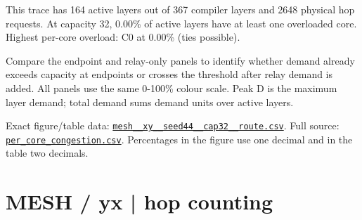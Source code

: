 \documentclass[10pt,a4paper]{article}
\begin{document}
This trace has 164 active layers out of 367 compiler layers and 2648 physical hop requests. At capacity 32, 0.00\% of active layers have at least one overloaded core. Highest per-core overload: C0 at 0.00\% (ties possible).\par
Compare the endpoint and relay-only panels to identify whether demand already exceeds capacity at endpoints or crosses the threshold after relay demand is added. All panels use the same 0-100\% colour scale. Peak D is the maximum layer demand; total demand sums demand units over active layers.\par
Exact figure/table data: \href{\detokenize{file:///home/dhruv-pansuriya/Documents/BTP/Compiler-Driven-ACE/output/pdf/qaoa_methods_congestion/tables/mesh__xy__seed44__cap32__route.csv}}{\nolinkurl{mesh__xy__seed44__cap32__route.csv}}. Full source: \href{\detokenize{file:///home/dhruv-pansuriya/Documents/BTP/Compiler-Driven-ACE/results/qaoa_2seed_2026-10-26/congestion/per_core_congestion.csv}}{\nolinkurl{per_core_congestion.csv}}. Percentages in the figure use one decimal and in the table two decimals.\par
\clearpage
\section*{MESH / yx | hop counting}
\end{document}
